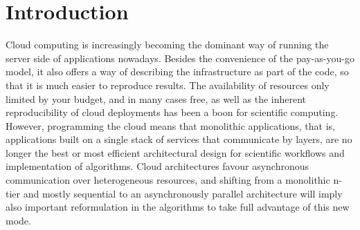 \documentclass[sigconf]{acmart}
\begin{document}


\maketitle

\section{Introduction}

Cloud computing is increasingly becoming the dominant way of running
the server side of applications nowadays. Besides the convenience of the pay-as-you-go
model, it also offers a way of describing the infrastructure as part
of the code, so that it is much easier to reproduce results.
The availability of resources only limited by your budget, and in many
cases free, as well as the inherent reproducibility of cloud
deployments has been a boon for scientific computing. However,
programming the cloud means that monolithic applications, that is,
applications built on a single stack of services that communicate by
layers, are no longer the best or most efficient architectural design
for scientific workflows and implementation of algorithms. Cloud
architectures favour asynchronous communication over heterogeneous
resources, and shifting from a monolithic n-tier and mostly sequential
to an asynchronously parallel architecture will imply also important
reformulation in the algorithms to take full advantage of this new
mode.
\end{document}
